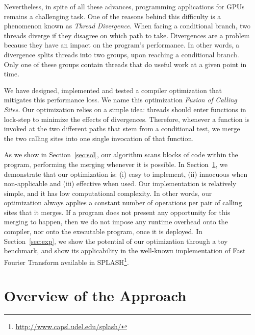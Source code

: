 \documentclass[times,10pt,twocolumn]{article}
\begin{document}
Nevertheless, in spite of all these advances, programming applications for
GPUs remains a challenging task.
One of the reasons behind this difficulty is a phenomenon known as
{\em Thread Divergence}.
When facing a conditional branch, two threads diverge if 
they disagree on which path to take.
Divergences are a problem because they have an impact on the program's
performance.
In other words, a divergence splits threads into two groups, upon reaching a
conditional branch.
Only one of these groups contain threads that do useful work at a given point
in time.

We have designed, implemented and tested a compiler optimization that
mitigates this performance loss.
We name this optimization {\em Fusion of Calling Sites}.
Our optimization relies on a simple idea: threads should enter functions
in lock-step to minimize the effects of divergences.
Therefore, whenever a function is invoked at the two different paths that stem
from a conditional test, we merge the two calling sites into one single
invocation of that function.

As we show in Section~\ref{sec:sol}, our algorithm scans blocks of code within
the program, performing the merging whenever it is possible.
In Section~\ref{sec:ovf}, we demonstrate that our optimization is:
(i) easy to implement, (ii) innocuous when non-applicable and
(iii) effective when used.
Our implementation is relatively simple, and it has low computational
complexity.
In other words, our optimization always applies a constant number of
operations per pair of calling sites that it merges.
If a program does not present any opportunity for this merging to happen,
then we do not impose any runtime overhead onto the compiler, nor onto the
executable program, once it is deployed.
In Section~\ref{sec:exp}, we show the potential of our optimization through a
toy benchmark, and show its applicability in the well-known implementation of
Fast Fourier Transform available in SPLASH\footnote{\url{http://www.capsl.udel.edu/splash/}}.

\section{Overview of the Approach}
\label{sec:ovf}
\end{document}
